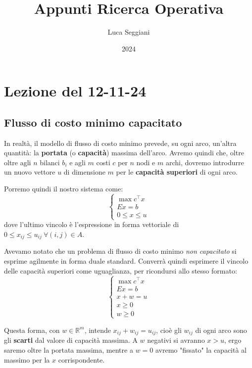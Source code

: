 \documentclass[a4paper,11pt]{article}
\title{Appunti Ricerca Operativa}
\author{Luca Seggiani}
\date{2024}
\begin{document}
\section{Lezione del 12-11-24}

\thispagestyle{empty}
\pagestyle{fancy}

\subsection{Flusso di costo minimo capacitato}
In realtà, il modello di flusso di costo minimo prevede, su ogni arco, un'altra quantità: la \textbf{portata} (o \textbf{capacità}) massima dell'arco.
Avremo quindi che, oltre oltre agli $n$ bilanci $b_i$ e agli $m$ costi $c$ per $n$ nodi e $m$ archi, dovremo introdurre un nuovo vettore $u$ di dimensione $m$ per le \textbf{capacità superiori} di ogni arco.

Porremo quindi il nostro sistema come:
\[
	\begin{cases}
		\max c^\intercal x \\ 
		Ex = b \\ 
		0 \leq x \leq u
	\end{cases}
\]
dove l'ultimo vincolo è l'espressione in forma vettoriale di $0 \leq x_{ij} \leq u_{ij} \ \forall (i, j) \in A$.

Avevamo notato che un problema di flusso di costo minimo \textit{non capacitato} si esprime agilmente in forma duale standard. 
Converrà quindi esprimere il vincolo delle capacità superiori come uguaglianza, per ricondursi allo stesso formato:
\[
	\begin{cases}
		\max c^\intercal x \\ 
		Ex = b \\
		x + w = u \\ 
		x \geq 0 \\ 
		w \geq 0
	\end{cases}
\]

Questa forma, con $w \in \mathbb{R}^m$, intende $x_ {ij} + w_{ij} = u_{ij}$, cioè gli $w_{ij}$ di ogni arco sono gli \textbf{scarti} dal valore di capacità massima. A $w$ negativi si avranno $x > u$, ergo saremo oltre la portata massima, mentre a $w = 0$ avremo "fissato" la capacità al massimo per la $x$ corrispondente.
\end{document}
